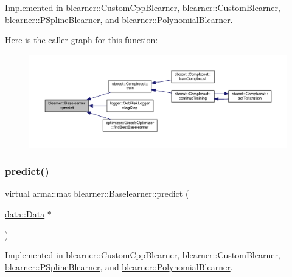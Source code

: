 Implemented in \mbox{\hyperlink{classblearner_1_1_custom_cpp_blearner_aa17db5f5627b8251b2d8484d92e783b9}{blearner\+::\+Custom\+Cpp\+Blearner}}, \mbox{\hyperlink{classblearner_1_1_custom_blearner_a20b5fe06512aa73478b9f934e1c81c31}{blearner\+::\+Custom\+Blearner}}, \mbox{\hyperlink{classblearner_1_1_p_spline_blearner_aa46e4474a352876fbfad64921254f6d5}{blearner\+::\+P\+Spline\+Blearner}}, and \mbox{\hyperlink{classblearner_1_1_polynomial_blearner_a422569884414d31db5a2b770b22176c3}{blearner\+::\+Polynomial\+Blearner}}.

Here is the caller graph for this function\+:\nopagebreak
\begin{figure}[H]
\begin{center}
\leavevmode
\includegraphics[width=350pt]{classblearner_1_1_baselearner_ab37986047db43c84420fef2cef7fc20d_icgraph}
\end{center}
\end{figure}
\mbox{\label{classblearner_1_1_baselearner_ae2ef5e018783578e02b3b5a33fa94eae}} 
\subsubsection{\texorpdfstring{predict()}{predict()}\hspace{0.1cm}{\footnotesize\ttfamily [2/2]}}
{\footnotesize\ttfamily virtual arma\+::mat blearner\+::\+Baselearner\+::predict (\begin{DoxyParamCaption}\item[{\mbox{\hyperlink{classdata_1_1_data}{data\+::\+Data}} $\ast$}]{ }\end{DoxyParamCaption})\hspace{0.3cm}{\ttfamily [pure virtual]}}



Implemented in \mbox{\hyperlink{classblearner_1_1_custom_cpp_blearner_af2326171640e94c3a00f813781710208}{blearner\+::\+Custom\+Cpp\+Blearner}}, \mbox{\hyperlink{classblearner_1_1_custom_blearner_a401a479834eb3896260cb57b4551ceb4}{blearner\+::\+Custom\+Blearner}}, \mbox{\hyperlink{classblearner_1_1_p_spline_blearner_a9d35aeb36c403c167fb7519379825873}{blearner\+::\+P\+Spline\+Blearner}}, and \mbox{\hyperlink{classblearner_1_1_polynomial_blearner_ae321c17adaab23b0d27685920c2608af}{blearner\+::\+Polynomial\+Blearner}}.


